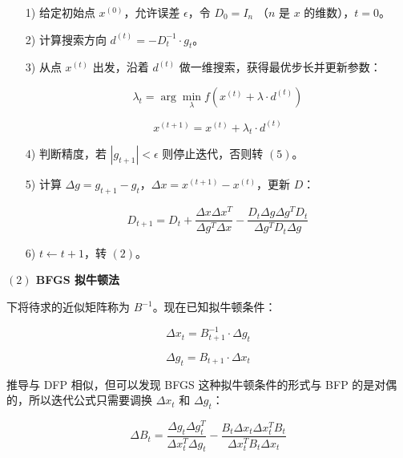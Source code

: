 \documentclass[UTF8]{ctexart}
\begin{document}
\begin{itemize}
\item [1)] 给定初始点 $x^(0)$，允许误差 $\epsilon$，令 $D_0=I_n$ （$n$ 是 $x$ 的维数），$t = 0$。 
\item [2)] 计算搜索方向 $d^{(t)}=-D_t^{-1}\cdot g_t$。
\item [3)] 从点 $x^{(t)}$ 出发，沿着 $d^{(t)}$ 做一维搜索，获得最优步长并更新参数：

\begin{equation}
\lambda_t = \arg \min_{\lambda} f(x^{(t)}+\lambda\cdot d^{(t)})
\end{equation}

\begin{equation}
x^{(t+1)}=x^{(t)}+\lambda_t\cdot d^{(t)}
\end{equation}

\item [4)] 判断精度，若 $|g_{t+1}|<\epsilon$  则停止迭代，否则转 $(5)$。

\item [5)] 计算 $\Delta g=g_{t+1}-g_t$，$\Delta x=x^{(t+1)}-x^{(t)}$，更新 $D$：

\begin{equation}
D_{t+1}=D_{t}+\frac{\Delta x\Delta x^T}{\Delta g^T\Delta x}-\frac{D_t\Delta g\Delta g^TD_t}{\Delta g^TD_t\Delta g}
\end{equation}

\item [6)] $t \gets t + 1$，转 $(2)$。

\end{itemize}


\textbf{$(2)$ BFGS 拟牛顿法} \par

下将待求的近似矩阵称为 $B^{-1}$。现在已知拟牛顿条件：

\begin{equation}
\Delta x_t=B_{t+1}^{-1}\cdot \Delta g_t
\end{equation}

\begin{equation}
\Delta g_t=B_{t+1} \cdot \Delta x_t
\end{equation}

推导与 DFP 相似，但可以发现 BFGS 这种拟牛顿条件的形式与 BFP 的是对偶的，所以迭代公式只需要调换 $\Delta x_t$ 和 $\Delta g_t$：

\begin{equation}
\Delta B_t = \frac{\Delta g_t\Delta g_t^T}{\Delta x_t^T\Delta g_t}-\frac{B_t\Delta x_t\Delta x_t^TB_t}{\Delta x_t^TB_t\Delta x_t}
\end{equation}
\end{document}
